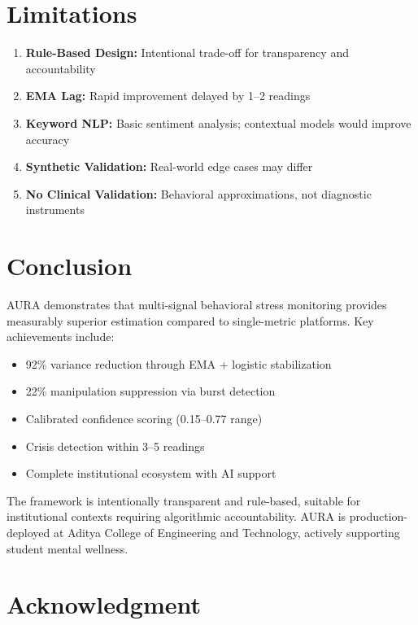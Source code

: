 \documentclass[conference]{IEEEtran}
\begin{document}
\section{Limitations}

\begin{enumerate}
    \item \textbf{Rule-Based Design:} Intentional trade-off for transparency and accountability
    \item \textbf{EMA Lag:} Rapid improvement delayed by 1--2 readings
    \item \textbf{Keyword NLP:} Basic sentiment analysis; contextual models would improve accuracy
    \item \textbf{Synthetic Validation:} Real-world edge cases may differ
    \item \textbf{No Clinical Validation:} Behavioral approximations, not diagnostic instruments
\end{enumerate}

\section{Conclusion}

AURA demonstrates that multi-signal behavioral stress monitoring provides measurably superior estimation compared to single-metric platforms. Key achievements include:

\begin{itemize}
    \item 92\% variance reduction through EMA + logistic stabilization
    \item 22\% manipulation suppression via burst detection
    \item Calibrated confidence scoring (0.15--0.77 range)
    \item Crisis detection within 3--5 readings
    \item Complete institutional ecosystem with AI support
\end{itemize}

The framework is intentionally transparent and rule-based, suitable for institutional contexts requiring algorithmic accountability. AURA is production-deployed at Aditya College of Engineering and Technology, actively supporting student mental wellness.

\section*{Acknowledgment}
\end{document}
